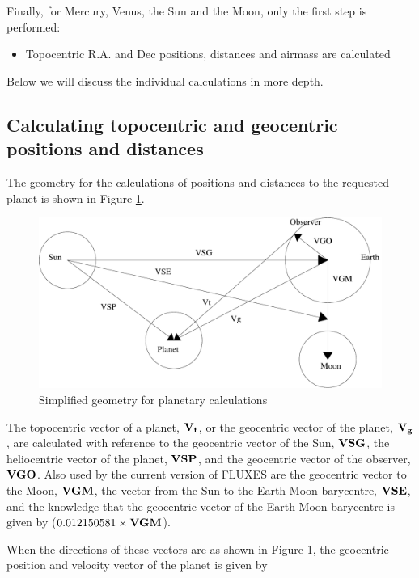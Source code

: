 \documentclass[11pt,twoside]{article}
\newcommand{\xlabel}[1]{}
\renewcommand{\_}{\texttt{\symbol{95}}}
\begin{document}
Finally, for Mercury, Venus, the Sun and the Moon, only the first step is performed:
\begin{itemize}
\item{Topocentric R.A. and Dec positions, distances and airmass are calculated}
\end{itemize}

Below we will discuss the individual calculations in more depth.

\subsection{Calculating topocentric and geocentric positions and distances}
\xlabel{positionsdistances}
\label{sec:positionsdistances}

The geometry for the calculations of positions and distances to the requested planet is shown in Figure \ref{fig:geom}.

\begin{figure}
\includegraphics[width=\textwidth]{sun213_fig2}
\vspace*{-0.5cm}
\caption{Simplified geometry for planetary calculations}
\label{fig:geom}
\end{figure}

The topocentric vector of a planet, $\bf{V_t}$, or the geocentric vector of the planet, $\bf{V_g}$, are calculated with reference to the geocentric vector of the Sun, $\bf{VSG}$, the heliocentric vector of the planet, $\bf{VSP}$, and the geocentric vector of the observer, $\bf{VGO}$.  Also used by the current version of FLUXES are the geocentric vector to the Moon, $\bf{VGM}$, the vector from the Sun to the Earth-Moon barycentre, $\bf{VSE}$, and the knowledge that the geocentric vector of the Earth-Moon barycentre is given by ($0.012150581 \times \bf{VGM}$).

When the directions of these vectors are as shown in Figure \ref{fig:geom}, the geocentric position and velocity vector of the planet is given by
\end{document}
